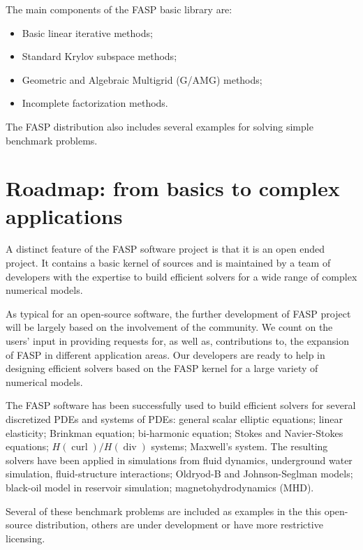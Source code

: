 \documentclass[11pt]{memoir}
\begin{document}
The main components of the FASP basic library are:
\begin{itemize}\setlength{\itemsep}{-1mm}
\item Basic linear iterative methods;
\item Standard Krylov subspace methods;
\item Geometric and Algebraic Multigrid (G/AMG) methods;
\item Incomplete factorization methods.
\end{itemize}
The FASP distribution also includes several examples for solving
simple benchmark problems.

\section{Roadmap: from basics to complex applications} 
A distinct feature of the FASP software project is that it is an open
ended project. It contains a basic kernel of sources and is maintained
by a team of developers with the expertise to build efficient solvers
for a wide range of complex numerical models.

As typical for an open-source software, the further development of
FASP project will be largely based on the involvement of the community. We
count on the users' input in providing requests for, as well as, contributions
to, the expansion of FASP in different application areas. Our
developers are ready to help in designing efficient solvers based
on the FASP kernel for a large variety of numerical models. 

The FASP software has been successfully used to build efficient
solvers for several discretized PDEs and systems of PDEs: 
general scalar elliptic equations; linear elasticity;
Brinkman equation; bi-harmonic equation; Stokes and Navier-Stokes
equations; $H(\operatorname{curl})/H(\operatorname{div})$ systems;
Maxwell's system. The resulting solvers have been applied in simulations from 
fluid dynamics, underground water simulation, fluid-structure
interactions; Oldryod-B and Johnson-Seglman models; black-oil model
in reservoir simulation; magnetohydrodynamics (MHD).

Several of these benchmark problems are included as examples in the
this open-source distribution, others are under development or have
more restrictive licensing.

%

\end{document}

